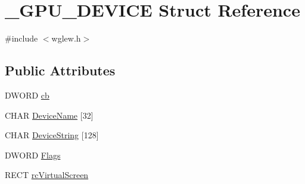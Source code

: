\hypertarget{struct___g_p_u___d_e_v_i_c_e}{\section{\-\_\-\-G\-P\-U\-\_\-\-D\-E\-V\-I\-C\-E Struct Reference}
\label{struct___g_p_u___d_e_v_i_c_e}
}


{\ttfamily \#include $<$wglew.\-h$>$}

\subsection*{Public Attributes}
\begin{DoxyCompactItemize}
\item 
D\-W\-O\-R\-D \hyperlink{struct___g_p_u___d_e_v_i_c_e_afcb22f16ba9e526610489ff56ab78ddb}{cb}
\item 
C\-H\-A\-R \hyperlink{struct___g_p_u___d_e_v_i_c_e_acdb1f0d784d7527ec04163439eff9038}{Device\-Name} \mbox{[}32\mbox{]}
\item 
C\-H\-A\-R \hyperlink{struct___g_p_u___d_e_v_i_c_e_a50b7b6a8eb397001ada4f5f918cc8065}{Device\-String} \mbox{[}128\mbox{]}
\item 
D\-W\-O\-R\-D \hyperlink{struct___g_p_u___d_e_v_i_c_e_a008db9d0f5fc13a5160805f40465f14a}{Flags}
\item 
R\-E\-C\-T \hyperlink{struct___g_p_u___d_e_v_i_c_e_aeb573bbeb3b6c589246720ef259b9a27}{rc\-Virtual\-Screen}
\end{DoxyCompactItemize}


